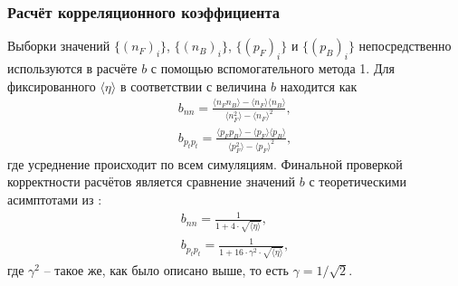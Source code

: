 \subsubsection{Расчёт корреляционного коэффициента}
Выборки значений $\{ (n_F)_i \}$, $\{ (n_B)_i \}$, $\{ (p_F)_i \}$ и $\{ (p_B)_i \}$ непосредственно используются в расчёте $b$ с помощью вспомогательного метода 1. Для фиксированного $\langle \eta \rangle$ в соответствии с \cite{bStatement} величина $b$ находится как 
\begin{equation} \label{eq:bCalc}
\begin{split}
	b_{nn} = \frac{\langle n_F n_B \rangle - \langle n_F \rangle \langle n_B \rangle}{\langle n_F^2 \rangle - \langle n_F \rangle^2}, \\
	b_{p_tp_t} = \frac{\langle p_F p_B \rangle - \langle p_F \rangle \langle p_B \rangle}{\langle p_F^2 \rangle - \langle p_F \rangle^2},
\end{split}
\end{equation}
где усреднение происходит по всем симуляциям. Финальной проверкой корректности расчётов является сравнение значений $b$ с теоретическими асимптотами из \cite{dissert}:
\begin{equation} \label{eq:bTheor}
\begin{split}
	b_{nn} = \frac{1}{1 + 4 \cdot \sqrt{\langle \eta \rangle}}, \quad \\
	b_{p_tp_t} = \frac{1}{1 + 16 \cdot \gamma^2 \cdot \sqrt{\langle \eta \rangle}},
\end{split}
\end{equation}
где $\gamma^2$ -- такое же, как было описано выше, то есть $\gamma = 1/\sqrt{2}$.
